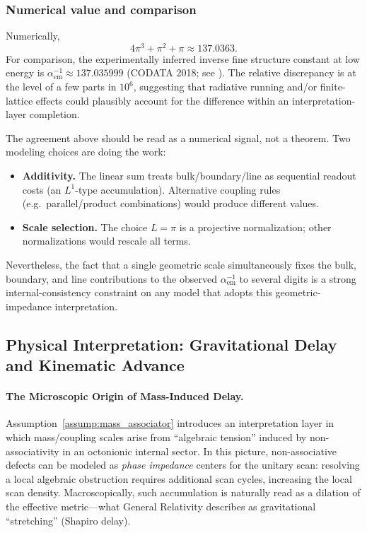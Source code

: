 \subsubsection{Numerical value and comparison}
Numerically,
$$
4\pi^3+\pi^2+\pi \approx 137.0363.
$$
For comparison, the experimentally inferred inverse fine structure constant at low energy is
$
\alpha_{\mathrm{em}}^{-1}\approx 137.035999
$
(CODATA 2018; see \cite{CODATA2018}).
The relative discrepancy is at the level of a few parts in $10^6$, suggesting that radiative running and/or finite-lattice effects could plausibly account for the difference within an interpretation-layer completion.

\begin{remark}
The agreement above should be read as a numerical signal, not a theorem.
Two modeling choices are doing the work:
\begin{itemize}
    \item \textbf{Additivity.} The linear sum treats bulk/boundary/line as sequential readout costs (an $L^1$-type accumulation). Alternative coupling rules (e.g.\ parallel/product combinations) would produce different values.
    \item \textbf{Scale selection.} The choice $L=\pi$ is a projective normalization; other normalizations would rescale all terms.
\end{itemize}
Nevertheless, the fact that a single geometric scale simultaneously fixes the bulk, boundary, and line contributions to the observed $\alpha_{\mathrm{em}}^{-1}$ to several digits is a strong internal-consistency constraint on any model that adopts this geometric-impedance interpretation.
\end{remark}

\subsection{Physical Interpretation: Gravitational Delay and Kinematic Advance}

\paragraph{The Microscopic Origin of Mass-Induced Delay.}
Assumption~\ref{assump:mass_associator} introduces an interpretation layer in which mass/coupling scales arise from ``algebraic tension'' induced by non-associativity in an octonionic internal sector. In this picture, non-associative defects can be modeled as \emph{phase impedance} centers for the unitary scan: resolving a local algebraic obstruction requires additional scan cycles, increasing the local scan density. Macroscopically, such accumulation is naturally read as a dilation of the effective metric---what General Relativity describes as gravitational ``stretching'' (Shapiro delay).


